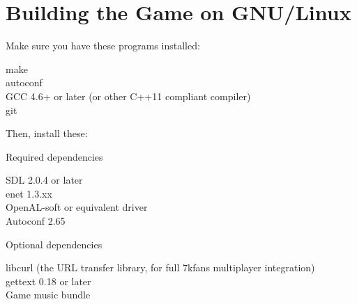 




\section{Building the Game on GNU/Linux}

Make sure you have these programs installed: 

\begin{adjustwidth}{1cm}{}
make \\
autoconf \\
GCC 4.6+ or later (or other C++11 compliant compiler) \\
git
\end{adjustwidth}

\clearpage
	
Then, install these:

Required dependencies

\begin{adjustwidth}{1cm}{}
SDL 2.0.4 or later \\
enet 1.3.xx \\
OpenAL-soft or equivalent driver \\
Autoconf 2.65
\end{adjustwidth}

Optional dependencies

\begin{adjustwidth}{1cm}{}
libcurl (the URL transfer library, for full 7kfans multiplayer integration) \\
gettext 0.18 or later \\
Game music bundle
\end{adjustwidth}

